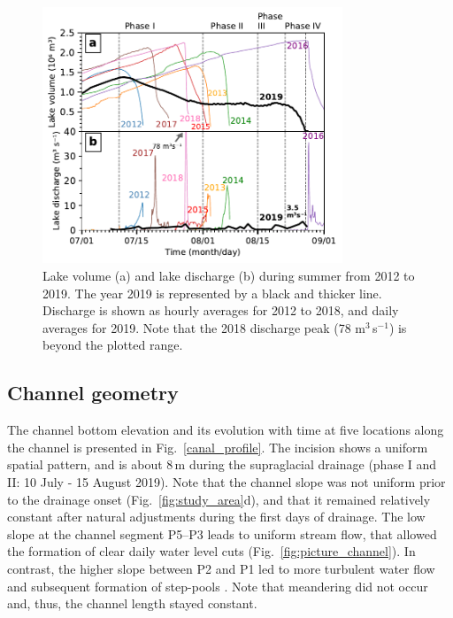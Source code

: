 \begin{figure}[h]
    \centering
    \includegraphics[width=0.8\textwidth]{chapters/chapter_plainemorte/fig02.pdf}
    \caption{Lake volume (a) and lake discharge (b) during summer from 2012 to 2019. The year 2019 is represented by a black and thicker line. Discharge is shown as  hourly averages for 2012 to 2018, and daily averages for 2019. Note that the 2018 discharge peak (78 m$^3$\,s$^{-1}$) is beyond the plotted range.}
    \label{fig:outburst}
\end{figure}

\subsection{Channel geometry}

The channel bottom elevation and its evolution with time at five locations along the channel is presented in Fig.~\ref{canal_profile}. The incision shows a uniform spatial pattern, and is about 8\,m during the supraglacial drainage (phase I and II: 10 July - 15 August 2019). Note that the channel slope was not uniform prior to the drainage onset (Fig.~\ref{fig:study_area}d), and that it remained relatively constant after natural adjustments during the first days of drainage. The low slope at the channel segment P5--P3 leads to uniform stream flow, that allowed the formation of clear daily water level cuts (Fig.~\ref{fig:picture_channel}). In contrast, the higher slope between P2 and P1 led to more turbulent water flow and subsequent formation of step-pools \citep[e.g.][]{Vatne&al2016}. Note that meandering \citep{Karlstrom&al2013} did not occur and, thus, the channel length stayed constant.

